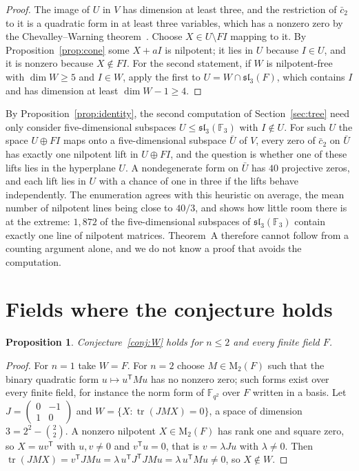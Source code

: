 \documentclass[11pt]{amsart}
\newtheorem{proposition}[theorem]{Proposition}
\theoremstyle{definition}
\theoremstyle{remark}
\numberwithin{equation}{section}
\newcommand{\F}{\mathbb{F}}
\newcommand{\M}{\mathrm{M}}
\newcommand{\sll}{\mathfrak{sl}}
\newcommand{\tr}{\operatorname{tr}}
\begin{document}
\begin{proof}
The image of $U$ in $V$ has dimension at least three, and the restriction of $\bar c_2$ to it is a quadratic form in at least three variables, which has a nonzero zero by the Chevalley--Warning theorem~\cite{Ch,Wa}. Choose $X\in U\setminus FI$ mapping to it. By Proposition~\ref{prop:cone} some $X+aI$ is nilpotent; it lies in $U$ because $I\in U$, and it is nonzero because $X\notin FI$. For the second statement, if $W$ is nilpotent-free with $\dim W\ge5$ and $I\in W$, apply the first to $U=W\cap\sll_3(F)$, which contains $I$ and has dimension at least $\dim W-1\ge4$.
\end{proof}

By Proposition~\ref{prop:identity}, the second computation of Section~\ref{sec:tree} need only consider five-dimensional subspaces $U\le\sll_3(\F_3)$ with $I\notin U$. For such $U$ the space $U\oplus FI$ maps onto a five-dimensional subspace $\bar U$ of $V$, every zero of $\bar c_2$ on $\bar U$ has exactly one nilpotent lift in $U\oplus FI$, and the question is whether one of these lifts lies in the hyperplane $U$. A nondegenerate form on $\bar U$ has $40$ projective zeros, and each lift lies in $U$ with a chance of one in three if the lifts behave independently. The enumeration agrees with this heuristic on average, the mean number of nilpotent lines being close to $40/3$, and shows how little room there is at the extreme: $1{,}872$ of the five-dimensional subspaces of $\sll_3(\F_3)$ contain exactly one line of nilpotent matrices. Theorem~A therefore cannot follow from a counting argument alone, and we do not know a proof that avoids the computation.

\section{Fields where the conjecture holds}\label{sec:holds}

\begin{proposition}\label{prop:two}
Conjecture~\ref{conj:W} holds for $n\le2$ and every finite field $F$.
\end{proposition}

\begin{proof}
For $n=1$ take $W=F$. For $n=2$ choose $M\in\M_2(F)$ such that the binary quadratic form $u\mapsto u^{\mathsf T}Mu$ has no nonzero zero; such forms exist over every finite field, for instance the norm form of $\F_{q^2}$ over $F$ written in a basis. Let $J=\left(\begin{smallmatrix}0&-1\\1&0\end{smallmatrix}\right)$ and $W=\{X:\tr(JMX)=0\}$, a space of dimension $3=2^2-\binom22$. A nonzero nilpotent $X\in\M_2(F)$ has rank one and square zero, so $X=uv^{\mathsf T}$ with $u,v\ne0$ and $v^{\mathsf T}u=0$, that is $v=\lambda Ju$ with $\lambda\ne0$. Then $\tr(JMX)=v^{\mathsf T}JMu=\lambda\,u^{\mathsf T}J^{\mathsf T}JMu=\lambda\,u^{\mathsf T}Mu\ne0$, so $X\notin W$.
\end{proof}
\end{document}
